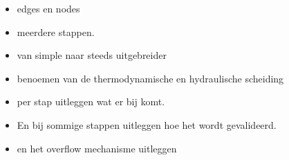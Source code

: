 \begin{itemize}
\item edges en nodes
\item meerdere stappen.
\item van simple naar steeds uitgebreider
\item benoemen van de thermodynamische en hydraulische scheiding 
\item per stap uitleggen wat er bij komt.
\item En bij sommige stappen uitleggen hoe het wordt gevalideerd.
\item en het overflow mechanisme uitleggen
\end{itemize}


